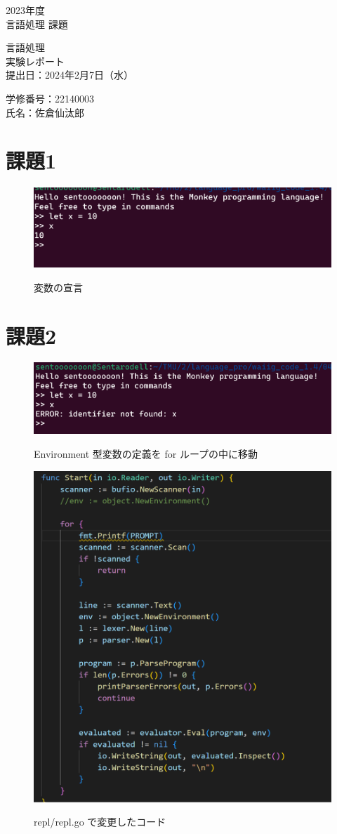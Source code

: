 \documentclass[fleqn, a4paper. 12pt]{ltjsarticle}
\begin{document}
\begin{titlepage}
      \begin{center}
      {
      \Huge 2023年度\\言語処理 課題}
      
      \vspace{4cm}
             {\Huge 言語処理\\
               実験レポート\\}
             \vspace{4cm}
                    {\large 提出日：2024年2月7日（水）\\}
                    
                    {\large 学修番号：22140003\\氏名：佐倉仙汰郎}
    \end{center}  
  \end{titlepage}

  \section{課題1}
  \begin{figure}[h]
    \centering
    \includegraphics[width=0.5\linewidth]{images/2/1.png}
    \label{fig:1}
    \caption{変数の宣言}
\end{figure}

\section{課題2}
\begin{figure}[h]
    \centering
    \includegraphics[width=0.5\linewidth]{images/2/2.png}
    \label{fig:2}
    \caption{Environment 型変数の定義を for ループの中に移動}
\end{figure}
\begin{figure}[h]
    \centering
    \includegraphics[width=0.5\linewidth]{images/2/2_repl.png}
    \label{fig:repl2}
    \caption{repl/repl.go で変更したコード}
\end{figure}
\end{document}
